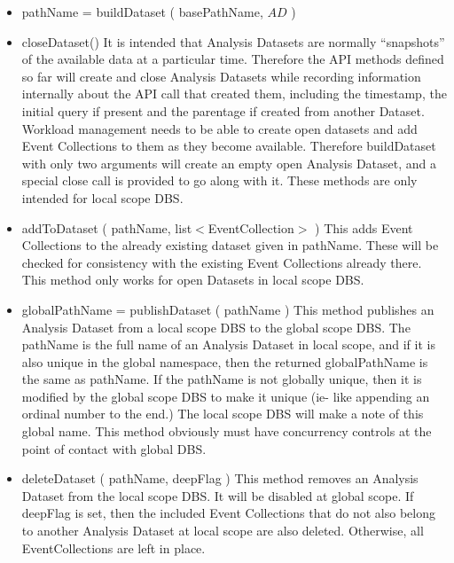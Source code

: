 \documentclass{cmspaper}
\begin{document}
\begin{itemize}
\item  pathName = buildDataset ( basePathName, $AD$ )
\item  closeDataset() 
       It is intended that Analysis Datasets are normally ``snapshots''
       of the available data at a particular time.  Therefore the API
       methods defined so far will create and close Analysis Datasets
       while recording information internally about the API call that
       created them, including the timestamp, the initial query if
       present and the parentage if created from another Dataset.
       Workload management needs to be able to create open datasets
       and add Event Collections to them as they become available.
       Therefore buildDataset with only two arguments will create an
       empty open Analysis Dataset, and a special close call is provided
       to go along with it.  These methods are only intended for local
       scope DBS.

\item  addToDataset ( pathName, list$<$EventCollection$>$ )
       This adds Event Collections to the already existing dataset given in 
       pathName.  These will be checked for consistency with the existing 
       Event Collections already there.  This method only works for 
       open Datasets in local scope DBS.
   
\item  globalPathName = publishDataset ( pathName )
      This method publishes an Analysis Dataset from a local scope DBS
      to the global scope DBS.  The pathName is the full name of an
      Analysis Dataset in local scope, and if it is also unique in the
      global namespace, then the returned globalPathName is the same
      as pathName.  If the pathName is not globally unique, then it
      is modified by the global scope DBS to make it unique (ie- like
      appending an ordinal number to the end.) The local scope DBS will
      make a note of this global name.  This method obviously must have
      concurrency controls at the point of contact with global DBS.

\item  deleteDataset ( pathName, deepFlag ) 
      This method removes an Analysis Dataset from the local scope DBS.
      It will be disabled at global scope.  If deepFlag is set, then
      the included Event Collections that do not also belong to another
      Analysis Dataset at local scope are also deleted.  Otherwise,
      all EventCollections are left in place.

\end{itemize}
\end{document}
